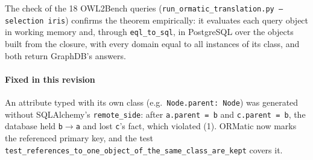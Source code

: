 The check of the 18 OWL2Bench queries (\texttt{run\_ormatic\_translation.py --selection iris})
confirms the theorem empirically: it evaluates each query object in working memory and, through
\texttt{eql\_to\_sql}, in PostgreSQL over the objects built from the closure, with every domain
equal to all instances of its class, and both return GraphDB's answers.

\paragraph{Fixed in this revision} An attribute typed with its own class (e.g.\
\texttt{Node.parent: Node}) was generated without SQLAlchemy's \texttt{remote\_side}: after
\texttt{a.parent = b} and \texttt{c.parent = b}, the database held \texttt{b}$\to$\texttt{a} and
lost \texttt{c}'s fact, which violated (1). ORMatic now marks the referenced primary key, and the
test \texttt{test\_references\_to\_one\_object\_of\_the\_same\_class\_are\_kept} covers it.
